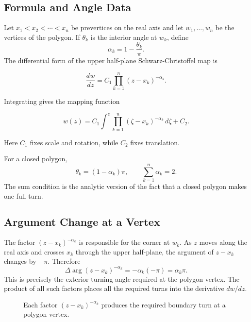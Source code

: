 \documentclass[12pt,a4paper]{article}
\newcommand{\halfplane}{
\begin{scope}
\fill[blue!4] (-2.2,0) rectangle (2.2,1.65);
\draw[->,thick] (-2.35,0) -- (2.45,0) node[right] {$\Re z$};
\draw[->,thick] (0,-0.25) -- (0,1.85) node[above] {$\Im z$};
\foreach \x/\lab in {-1.6/$x_1$,-0.6/$x_2$,0.55/$x_3$,1.65/$x_4$}{
  \filldraw[red!70!black] (\x,0) circle (2pt) node[below=4pt] {\lab};
}
\node at (0,1.35) {upper half-plane};
\end{scope}
}
\begin{document}
\subsection{Formula and Angle Data}

Let \(x_1<x_2<\cdots<x_n\) be prevertices on the real axis and let \(w_1,\ldots,w_n\) be the vertices of the polygon. If \(\theta_k\) is the interior angle at \(w_k\), define
\[
\alpha_k=1-\frac{\theta_k}{\pi}.
\]
The differential form of the upper half-plane Schwarz-Christoffel map is
\begin{formulabox}
\[
\frac{dw}{dz}=C_1\prod_{k=1}^{n}(z-x_k)^{-\alpha_k}.
\]
\end{formulabox}
Integrating gives the mapping function
\begin{formulabox}
\[
w(z)=C_1\int^z\prod_{k=1}^{n}(\zeta-x_k)^{-\alpha_k}\,d\zeta+C_2.
\]
\end{formulabox}
Here \(C_1\) fixes scale and rotation, while \(C_2\) fixes translation.

\begin{theorembox}
For a closed polygon,
\[
\theta_k=(1-\alpha_k)\pi,\qquad \sum_{k=1}^{n}\alpha_k=2.
\]
The sum condition is the analytic version of the fact that a closed polygon makes one full turn.
\end{theorembox}

\subsection{Argument Change at a Vertex}

The factor \((z-x_k)^{-\alpha_k}\) is responsible for the corner at \(w_k\). As \(z\) moves along the real axis and crosses \(x_k\) through the upper half-plane, the argument of \(z-x_k\) changes by \(-\pi\). Therefore
\[
\Delta\arg (z-x_k)^{-\alpha_k}
=-\alpha_k(-\pi)=\alpha_k\pi.
\]
This is precisely the exterior turning angle required at the polygon vertex. The product of all such factors places all the required turns into the derivative \(dw/dz\).

\begin{figure}[H]
\centering
{}
\caption{Each factor \((z-x_k)^{-\alpha_k}\) produces the required boundary turn at a polygon vertex.}
\end{figure}
\end{document}
